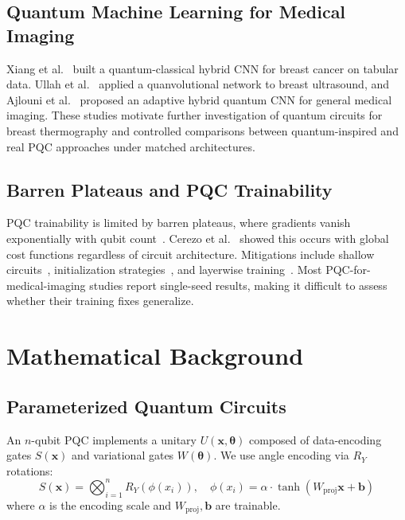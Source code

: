 \documentclass[conference]{IEEEtran}
\begin{document}
\subsection{Quantum Machine Learning for Medical Imaging}
Xiang et al.~\cite{xiang2024qccnn} built a quantum-classical hybrid CNN for breast cancer on tabular data. Ullah et al.~\cite{quanvolutional_breast2024} applied a quanvolutional network to breast ultrasound, and Ajlouni et al.~\cite{ajlouni2023adaptive} proposed an adaptive hybrid quantum CNN for general medical imaging. These studies motivate further investigation of quantum circuits for breast thermography and controlled comparisons between quantum-inspired and real PQC approaches under matched architectures.

\subsection{Barren Plateaus and PQC Trainability}
PQC trainability is limited by barren plateaus, where gradients vanish exponentially with qubit count~\cite{mcclean2018barren}. Cerezo et al.~\cite{cerezo2021cost} showed this occurs with global cost functions regardless of circuit architecture. Mitigations include shallow circuits~\cite{cerezo2021cost}, initialization strategies~\cite{grant2019initialization}, and layerwise training~\cite{skolik2021layerwise}. Most PQC-for-medical-imaging studies report single-seed results, making it difficult to assess whether their training fixes generalize.

\section{Mathematical Background}

\subsection{Parameterized Quantum Circuits}
An $n$-qubit PQC implements a unitary $U(\mathbf{x}, \boldsymbol{\theta})$ composed of data-encoding gates $S(\mathbf{x})$ and variational gates $W(\boldsymbol{\theta})$. We use angle encoding via $R_Y$ rotations:
\begin{equation}
S(\mathbf{x}) = \bigotimes_{i=1}^{n} R_Y(\phi(x_i)), \quad \phi(x_i) = \alpha \cdot \tanh(W_{\text{proj}} \mathbf{x} + \mathbf{b})
\label{eq:encoding}
\end{equation}
where $\alpha$ is the encoding scale and $W_{\text{proj}}, \mathbf{b}$ are trainable.
\end{document}
